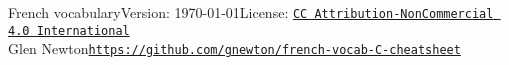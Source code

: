 \documentclass[10pt,landscape,letter]{article}
\begin{document}

{
\Large French vocabulary\hfill \small Version: \today\hfill License: \href{https://creativecommons.org/licenses/by-nc/4.0/}{\tt CC Attribution-NonCommercial 4.0 International}}\\
 {Glen Newton}\hfill {\tt \url{https://github.com/gnewton/french-vocab-C-cheatsheet}}


    
\footnotesize
\begin{multicols*}{4}








\end{multicols*}
\end{document}
